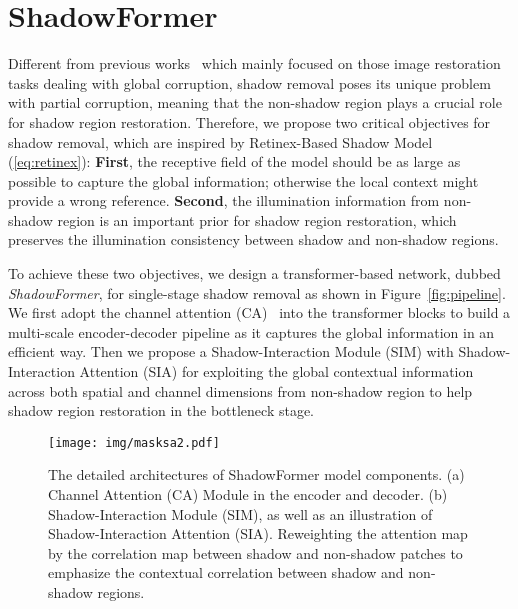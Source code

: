 \documentclass[letterpaper]{article} \usepackage{aaai23}  \usepackage{times}  \usepackage{helvet}  \usepackage{courier}  \usepackage[hyphens]{url}  \usepackage{graphicx} \urlstyle{rm} \def\UrlFont{\rm}  \usepackage{natbib}  \usepackage{caption} \frenchspacing  \setlength{\pdfpagewidth}{8.5in} \setlength{\pdfpageheight}{11in} \usepackage{algorithm}
\begin{document}
\section{ShadowFormer}
Different from previous works~\cite{liang2021swinir,wang2021uformer} which mainly focused on those image restoration tasks dealing with global corruption, shadow removal poses its unique problem with partial corruption, meaning that the non-shadow region plays a crucial role for shadow region restoration.
Therefore, we propose two critical objectives for shadow removal, which are inspired by Retinex-Based Shadow Model (\ref{eq:retinex}): \textbf{First}, the receptive field of the model should be as large as possible to capture the global information; otherwise the local context might provide a wrong reference.
\textbf{Second}, the illumination information from non-shadow region is an important prior for shadow region restoration, which preserves the illumination consistency between shadow and non-shadow regions.




To achieve these two objectives, we design a transformer-based network, dubbed \textit{ShadowFormer}, for single-stage shadow removal as shown in Figure~\ref{fig:pipeline}.
We first adopt the channel attention (CA)~\cite{hu2018squeeze} into the transformer blocks to build a multi-scale encoder-decoder pipeline as it captures the global information in an efficient way.
Then we propose a Shadow-Interaction Module (SIM) with Shadow-Interaction Attention (SIA) for exploiting the global contextual information across both spatial and channel dimensions from non-shadow region to help shadow region restoration in the bottleneck stage.

\begin{figure*}[!t]
\centering
\texttt{[image: img/masksa2.pdf]} 
\vspace{-0.2cm}
\caption{The detailed architectures of ShadowFormer model components. (a) Channel Attention (CA) Module in the encoder and decoder. (b) Shadow-Interaction Module (SIM), as well as an illustration of Shadow-Interaction Attention (SIA). Reweighting the attention map by the correlation map between shadow and non-shadow patches to emphasize the contextual correlation between shadow and non-shadow regions.}
\label{fig:masksa} 
\end{figure*}
\end{document}
